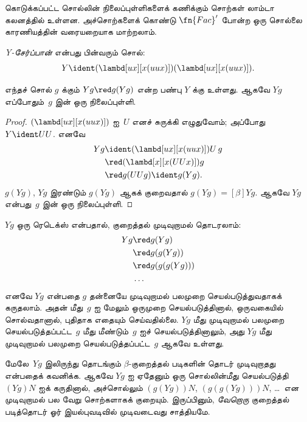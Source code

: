 \documentclass[../../../include/open-logic-section]{subfiles}
\begin{document}
கொடுக்கப்பட்ட சொல்லின் நிலைப்புள்ளிகளைக் கணிக்கும் சொற்கள் லாம்டா கலனத்தில்
உள்ளன. அச்சொற்களைக் கொண்டு $\fn{Fac}'$ போன்ற ஒரு சொல்லை காரணியத்தின்
வரையறையாக மாற்றலாம்.

\begin{defn}
  \emph{Y-சேர்ப்பான்} என்பது பின்வரும் சொல்:
  \[
  Y \ident (\lambd[ux][x(uux)])(\lambd[ux][x(uux)]).
  \]
\end{defn}

\begin{thm}
  எந்தச் சொல் $g$ க்கும் $Yg \red g(Yg)$ என்ற பண்பு $Y$ க்கு உள்ளது.
  ஆகவே $Yg$ எப்போதும்~$g$ இன் ஒரு நிலைப்புள்ளி.
\end{thm}

\begin{proof}
  $(\lambd[ux][x(uux)])$ ஐ~$U$ எனச் சுருக்கி எழுதுவோம்; அப்போது
  $Y \ident UU$. எனவே
  \begin{align*}
    Y g &\ident (\lambd[ux][x(uux)])U\,g \\
    &\red (\lambd[x][x(UUx)])g\\
    & \red g(UUg) \ident g(Yg).
  \end{align*}
  $g(Yg)$, $Yg$ இரண்டும் $g(Yg)$ ஆகக் குறைவதால்
  $g(Yg) \equal[\beta] Yg$. ஆகவே $Yg$ என்பது~$g$ இன் ஒரு நிலைப்புள்ளி.
\end{proof}

$Yg$ ஒரு ரெடெக்ஸ் என்பதால், குறைத்தல் முடிவுறாமல் தொடரலாம்:
\begin{align*}
  Y g &\red g (Y g) \\
    &\red g (g (Y g)) \\
    &\red g(g (g (Y g)))\\
    &\ldots
\end{align*}
எனவே $Yg$ என்பதை $g$ தன்னையே முடிவுறாமல் பலமுறை செயல்படுத்துவதாகக்
கருதலாம். அதன் மீது~$g$ ஐ மேலும் ஒருமுறை செயல்படுத்தினால்,
ஒருவகையில் சொல்வதானால், புதிதாக எதையும் செய்வதில்லை. $Yg$ மீது முடிவுறாமல்
பலமுறை செயல்படுத்தப்பட்ட~$g$ மீது மீண்டும்~$g$ ஐச் செயல்படுத்தினாலும்,
அது $Yg$ மீது முடிவுறாமல் பலமுறை செயல்படுத்தப்பட்ட~$g$ ஆகவே உள்ளது.

மேலே~$Yg$ இலிருந்து தொடங்கும் $\beta$-குறைத்தல் படிகளின் தொடர் முடிவுறாதது
என்பதைக் கவனிக்க. ஆகவே $Yg$ ஐ ஏதேனும் ஒரு சொல்லின்மீது செயல்படுத்தி
$(Yg)N$ ஐக் கருதினால், அச்சொல்லும் $(g(Yg))N$, $(g(g(Yg)))N$, \dots\
என முடிவுறாமல் பல வேறு சொற்களாகக் குறையும். இருப்பினும்,
\emph{வேறொரு} குறைத்தல் படித்தொடர் ஓர் இயல்புவடிவில் முடிவடைவது
சாத்தியமே.
\end{document}
